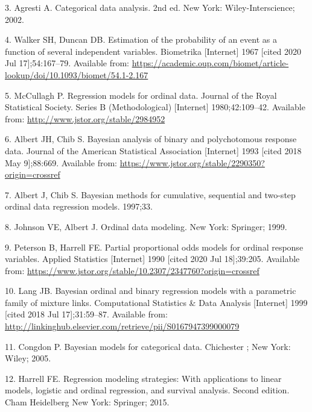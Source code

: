 \documentclass[
]{article}
\begin{document}
\leavevmode\hypertarget{ref-agresti_categorical_2002}{}%
3. Agresti A. Categorical data analysis. 2nd ed. New York: Wiley-Interscience; 2002.

\leavevmode\hypertarget{ref-walker_estimation_1967}{}%
4. Walker SH, Duncan DB. Estimation of the probability of an event as a function of several independent variables. Biometrika {[}Internet{]} 1967 {[}cited 2020 Jul 17{]};54:167--79. Available from: \url{https://academic.oup.com/biomet/article-lookup/doi/10.1093/biomet/54.1-2.167}

\leavevmode\hypertarget{ref-peter_mccullagh_regression_1980}{}%
5. McCullagh P. Regression models for ordinal data. Journal of the Royal Statistical Society. Series B (Methodological) {[}Internet{]} 1980;42:109--42. Available from: \url{http://www.jstor.org/stable/2984952}

\leavevmode\hypertarget{ref-albert_bayesian_1993}{}%
6. Albert JH, Chib S. Bayesian analysis of binary and polychotomous response data. Journal of the American Statistical Association {[}Internet{]} 1993 {[}cited 2018 May 9{]};88:669. Available from: \url{https://www.jstor.org/stable/2290350?origin=crossref}

\leavevmode\hypertarget{ref-albert_bayesian_1997}{}%
7. Albert J, Chib S. Bayesian methods for cumulative, sequential and two-step ordinal data regression models. 1997;33.

\leavevmode\hypertarget{ref-johnson_ordinal_1999}{}%
8. Johnson VE, Albert J. Ordinal data modeling. New York: Springer; 1999.

\leavevmode\hypertarget{ref-peterson_partial_1990}{}%
9. Peterson B, Harrell FE. Partial proportional odds models for ordinal response variables. Applied Statistics {[}Internet{]} 1990 {[}cited 2020 Jul 18{]};39:205. Available from: \url{https://www.jstor.org/stable/10.2307/2347760?origin=crossref}

\leavevmode\hypertarget{ref-lang_bayesian_1999}{}%
10. Lang JB. Bayesian ordinal and binary regression models with a parametric family of mixture links. Computational Statistics \& Data Analysis {[}Internet{]} 1999 {[}cited 2018 Jul 17{]};31:59--87. Available from: \url{http://linkinghub.elsevier.com/retrieve/pii/S0167947399000079}

\leavevmode\hypertarget{ref-congdon_bayesian_2005}{}%
11. Congdon P. Bayesian models for categorical data. Chichester ; New York: Wiley; 2005.

\leavevmode\hypertarget{ref-harrell_regression_2015}{}%
12. Harrell FE. Regression modeling strategies: With applications to linear models, logistic and ordinal regression, and survival analysis. Second edition. Cham Heidelberg New York: Springer; 2015.
\end{document}
